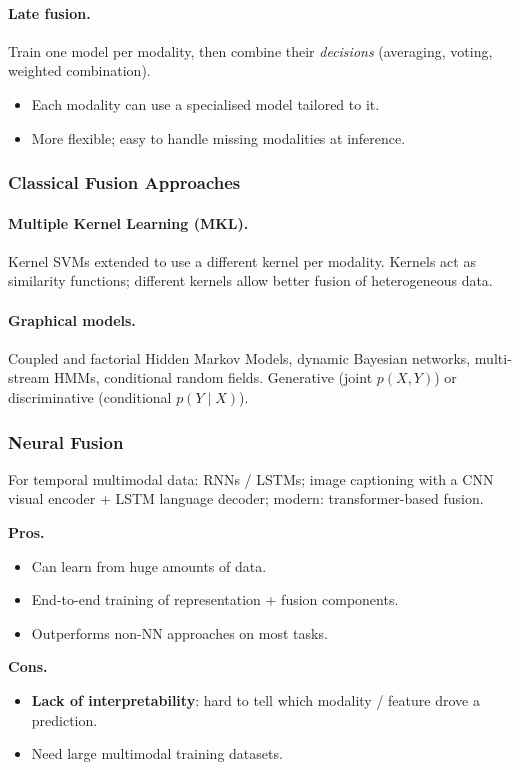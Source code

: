 \documentclass[11pt,a4paper]{article}
\theoremstyle{definition}
\theoremstyle{plain}
\theoremstyle{remark}
\begin{document}
\paragraph{Late fusion.} Train one model per modality, then combine their \emph{decisions} (averaging, voting, weighted combination).
\begin{itemize}
    \item[+] Each modality can use a specialised model tailored to it.
    \item[+] More flexible; easy to handle missing modalities at inference.
\end{itemize}

\subsubsection{Classical Fusion Approaches}

\paragraph{Multiple Kernel Learning (MKL).} Kernel SVMs extended to use a different kernel per modality. Kernels act as similarity functions; different kernels allow better fusion of heterogeneous data.

\paragraph{Graphical models.} Coupled and factorial Hidden Markov Models, dynamic Bayesian networks, multi-stream HMMs, conditional random fields. Generative (joint $p(X,Y)$) or discriminative (conditional $p(Y\mid X)$).

\subsubsection{Neural Fusion}

For temporal multimodal data: RNNs / LSTMs; image captioning with a CNN visual encoder + LSTM language decoder; modern: transformer-based fusion.

\begin{tcolorbox}[colback=green!5!white, colframe=green!60!black, title={Neural fusion: pros and cons}]
\textbf{Pros.}
\begin{itemize}
    \item Can learn from huge amounts of data.
    \item End-to-end training of representation + fusion components.
    \item Outperforms non-NN approaches on most tasks.
\end{itemize}
\textbf{Cons.}
\begin{itemize}
    \item \textbf{Lack of interpretability}: hard to tell which modality / feature drove a prediction.
    \item Need large multimodal training datasets.
\end{itemize}
\end{tcolorbox}
\end{document}
